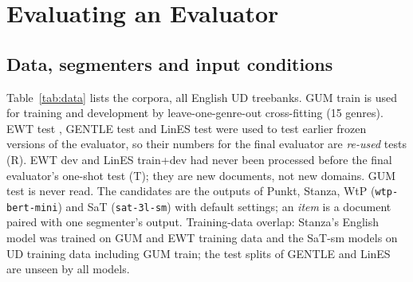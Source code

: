 
\section{Evaluating an Evaluator}
\label{sec:eval}

\subsection{Data, segmenters and input conditions}
\label{sec:data}
Table~\ref{tab:data} lists the corpora, all English UD treebanks. GUM train \citep{zeldes-2017-gum} is used for training
and development by leave-one-genre-out cross-fitting (15 genres). EWT test \citep{silveira-etal-2014-gold}, GENTLE
test \citep{aoyama-etal-2023-gentle} and LinES test \citep{ahrenberg-2007-lines} were used to test earlier frozen
versions of the evaluator, so their numbers for the final evaluator are \emph{re-used} tests (R). EWT dev and LinES
train+dev had never been processed before the final evaluator's one-shot test (T); they are new documents, not new
domains. GUM test is never read. The candidates are the outputs of Punkt, Stanza, WtP (\texttt{wtp-bert-mini}) and SaT
(\texttt{sat-3l-sm}) with default settings; an \emph{item} is a document paired with one segmenter's output. Training-data
overlap: Stanza's English model was trained on GUM and EWT training data and the SaT-sm models on UD training data
including GUM train; the test splits of GENTLE and LinES are unseen by all models.

